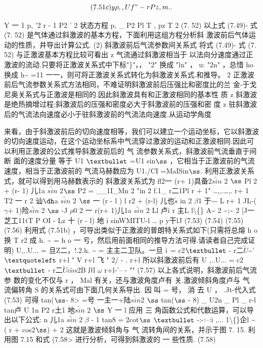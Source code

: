 \[(7.51c) y\rho  ,  , Uf" - r Pz , m ..\]

Y 一 1 p, '2 r - 1 P2 ' 2 状态方程 p, \_ P2 Pl T , pz T 2 (7. 52) 以上式 (7.49)- 式 (7. 52) 是气体通过斜激波的基本方程，下面利用这组方程分析斜 激波前后气体运动的性质，井导出计算公式. (2) 斜激波前后气流参数间关系式 将式 (7.49)- 式 (7. 52) 与正激波基本方程比较可看出 z 气流通过斜激波相当于 以法向分速度通过正激波的流动.只要将正激波关系式中下标"\}"，， "2" 换成 "ln" ， u: "2n" ，总惜 ho 换成 h\textasciitilde{} =11 一一，则可将正激波关系式转化为斜激波关系式.和推导。 2 正激波前后气流参数关系式方法相同，不难证明斜激波前后压强比和密度比的兰 金-于戈尼奥关系式与正激波是相同的.因此斜激波具有和正激波相同的基本性 质 z 斜激波是绝热摘增过程;斜激波后的压强和密度必大于斜激波前的压强和密 度 z 驻斜激波后的气流法向速度必小于驻斜激波前的气流法向速度.从运动学角度

来看，由于斜激波前后的切向速度相等，我们可以建立一个运动坐标，它以斜激波 的切向速度运动，在这个运动坐标系中气流穿过激波的运动和正激波相同.因此可 以利用正激波的公式推导斜激波前后的 气 流参数关系式，斜激波前气流垂直于间断 面的速度分量 等于 U1 ${\rm •}$ =U1 sin${\rm ß}$ ，它相当于正激波前的气流速度，相当于正激波前的 气流马赫数应为 U1./CI =MaISin${\rm ß}$. 利用正激波关系式，就可以得到用马赫数表示的 斜激波关系式为 fl2一 (r+ 1)具备2$\tilde{sin}$ 2 ${\rm ß}$ Pl 2 + (r- 1) 儿1a $\tilde{sin}$ 2${\rm ß}$ P2 = \_\_1I\_Mn 2 "in 2 f.1\_ r二1Pl r + 1" …,..…,. r+ 1 T2 一 r 2 讪${\rm ð}$a $\tilde{sin}$ 2 ${\rm ß}$ 一 (r - l ) l r2 + (r-l) 儿也$\tilde{s}$ in 2 $\beta$1 于\textasciitilde{}- L r+ 1 JL-($\gamma$+ 1)险$\tilde{sin}$ 2 ${\rm ß}$ -J $\rho$0 2 一 r(r+ 1)儿1a $\tilde{sin}$ 2 Ll 卢i r 主L l\textbackslash\{\} A\textasciitilde{} 2 \textasciitilde{};\textasciitilde{} 2 [J一芝工11tT P OI - Lz 十 (r - l) 地 i sinWMITU-l … p y干lJ (7.53) (7.54) (7.55) (7.56) 利用式 (7.51b) ，可导出类似于正激波的普朗特关系式如下(只需将总熔 h o 换 T r2 成 h. \textasciitilde{} = h o 一 亏，然后用前面相同的推导方法可得.请读者自己完成证明) U,..U... = 旦Z二，!.2.h. \textasciitilde{} = 主主二卫队。一旦 ${\rm i}$ = c2${\rm •}$ - r二$\tilde{U}$\textasciitilde{}' ${\rm ‘}$ r+l " V r+l 飞 " 2/ - . r+l 所以斜激波前后有 U ,..U... = c2${\rm •}$ - r二$\tilde{U}$$\tilde{cos}$2B 川 $\omega$ r+l-'-- - "" (7.57) 以上各式说明，斜激波前后气流 参 数的变化不仅与 r ， Mal 有关，还与激波角度卢有 关.激波倾斜角度卢与 气 流偏转角 S 的关系式可由下面几何关系导出. 因 叫 = 号， 消 去 U ， .Jt-代入式 (7.53) 可得 tan(${\rm ß}$- 8> =号 一主一+陆$\tilde{sin}$2 ${\rm ß}$ tan(${\rm ß}$ - 8) \_ U2n \_ Pl \_ r-l tan卢 U 1n P2 r土1 地$\tilde{sin}$ 2 ${\rm ß}$ Y 一 l 应用 三 角函数公式和代数运算，可以导出以下公式: n 儿1a $\tilde{sin}$ 2 $\beta$ - 1 tan8 = 2cot${\rm ß}$ ${\rm •}$ -:-:--:i ,... 1\textbackslash\{\}企l \textasciitilde{} ( r + cos2${\rm ß}$) + 2 这就是激波倾斜角与 气 流转角间的关系，并示于图 7. 15. 利用图 7.15 和式 (7.58> 进行分析，可得到斜激波的 一 些性质. (7.58)

